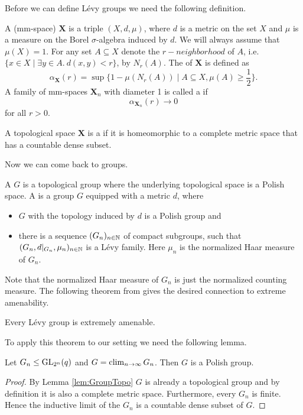 Before we can define L\'evy groups we need the following definition.
\begin{definition}
A  (mm-space) $\boldsymbol{X}$ is a triple $(X,d,\mu)$, where $d$ is a metric on the set $X$ and $\mu$ is a measure on the Borel $\sigma$-algebra induced by $d$. We will always assume that $\mu(X)=1$. 
For any set $A\subseteq X$ denote the $r-neighborhood$ of $A$, i.e. $\{x\in X\mid\exists y\in A.\  d(x,y)<r\}$, by $N_r(A)$.
The  of $\boldsymbol{X}$ is defined as 
\[\alpha_{\boldsymbol{X}}(r)=\sup\{1-\mu(N_r(A))\mid A\subseteq X, \mu(A)\geq\frac{1}{2}\}.\]
A family of mm-spaces $\boldsymbol{X}_n$ with diameter 1 is called a  if 
\[\alpha_{\boldsymbol{X}_n}(r)\to 0\]
for all $r>0$.

A topological space $\boldsymbol{X}$ is a  if it is homeomorphic to a complete metric space that has a countable dense subset.
\end{definition}

Now we can come back to groups.
\begin{definition}
A  $G$ is a topological group where the underlying topological space is a Polish space. A  is a group $G$ equipped with a metric $d$, where
\begin{itemize}
\item $G$ with the topology induced by $d$ is a Polish group and
\item there is a sequence $(G_n)_{n\in\mathbb{N}}$ of compact subgroups, such that $(G_n,d|_{G_n},\mu_n)_{n\in\mathbb{N}}$ is a L\'evy family. Here $\mu_n$ is the normalized Haar measure of $G_n$.
\end{itemize}  
\end{definition}
Note that the normalized Haar measure of $G_n$ is just the normalized counting measure.
The following theorem from \cite{Levy} gives the desired connection to extreme amenability.
\begin{theorem}
Every L\'evy group is extremely amenable.
\end{theorem}

To apply this theorem to our setting we need the following lemma.
\begin{lemma}
Let $G_n\leq\operatorname{GL}_{2^n}(q)$ and $G=\operatorname{clim}\limits_{n\to\infty} G_n$. Then $G$ is a Polish group. 
\end{lemma}
\begin{proof}
By Lemma \ref{lem:GroupTopo} $G$ is already a topological group and by definition it is also a complete metric space. Furthermore, every $G_n$ is finite. Hence the inductive limit of the $G_n$ is a countable dense subset of $G$.
\end{proof}

